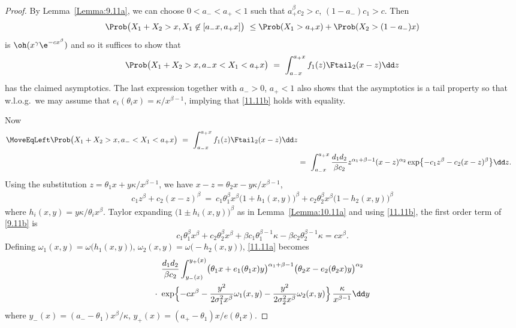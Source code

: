 \begin{proof}
By Lemma~\ref{Lemma:9.11a}, we can choose $0<a_-<a_+<1$ such that $a_+^\beta c_2>c$, $(1-a_-) c_1>c$.
Then
\[\Prob\bigl (X_1+X_2>x,X_1\not \in [a_-x,a_+x]\bigr)\ \le \Prob(X_1>a_+x)+
\Prob(X_2>(1-a_-)x)
\]
is $\oh(x^{\gamma}\e^{-cx^\beta})$ and so it suffices to show that
\begin{equation}\label{9.11a}\Prob\bigl (X_1+X_2>x, a_-x<X_1<a_+x\bigr)
\ =\ \int_{a_-x}^{a_+x} f_1(z)\Ftail_2(x-z)\dd z\end{equation}
has the claimed asymptotics. The last expression together with $a_->0$, $a_+<1$ also
shows that the asymptotics is a tail property so that w.l.o.g.\ we may assume that
$e_i(\theta_i x)=\kappa/x^{\beta-1}$,  implying  that \eqref{11.11b} holds with equality.

Now
\begin{align}\nonumber \MoveEqLeft  \Prob\bigl (X_1+X_2>x, a_-<X_1<a_+x\bigr)\ =\
\int_{a_-x}^{a_+x} f_1(z)\Ftail_2(x-z)\dd z\\ \label{11.11a} &= \ \int_{a_-x}^{a_+x} \frac{d_1d_2}{\beta c_2}
z^{\alpha_1+\beta-1}(x-z)^{\alpha_2}
\exp\bigl\{-c_1z^\beta-c_2(x-z)^\beta\bigr\}\dd z.
\end{align}
Using the substitution $z=\theta_1x+y\kappa/x^{\beta-1}$, we have $x-z= \theta_2x-y\kappa/x^{\beta-1}$,
\begin{align}\label{9.11b}
c_1z^\beta+c_2(x-z)^\beta \ =\ c_1\theta_1^\beta x^\beta
\bigl(1+h_1(x,y)\bigl)^\beta+c_2\theta_2^\beta x^\beta
\bigl(1-h_2(x,y)\bigl)^\beta
\end{align}
where $h_i(x,y)=y\kappa/\theta_ix^\beta$.
Taylor expanding  $\bigl(1\pm h_i(x,y)\bigl)^\beta$ as in Lemma~\ref{Lemma:10.11a}
and using \eqref{11.11b}, the first order term of \eqref{9.11b} is
\[ c_1\theta_1^\beta x^\beta +c_2\theta_2^\beta x^\beta + \beta c_1\theta_1^{\beta-1}\kappa - \beta c_2\theta_2^{\beta-1}\kappa =c x^\beta. \]
Defining
$\omega_1(x,y)=\omega\bigl(h_1(x,y)\bigr)$, $\omega_2(x,y)=\omega\bigl(-h_2(x,y)\bigr)$, \eqref{11.11a} becomes
 \begin{multline}\nonumber
\frac{d_1d_2}{\beta c_2} \int_{y_-(x)}^{y_+(x)}
\bigl(\theta_1x+e_1(\theta_1x)y\bigr)^{\alpha_1+\beta-1}\bigl(\theta_2x-e_2(\theta_2x)y\bigr)^{\alpha_2}
\\ \cdot\ \exp\Bigl\{-cx^\beta
-\frac{y^2}{2\sigma_1^2x^\beta}\omega_1(x,y)-\frac{y^2}{2\sigma_2^2x^\beta}\omega_2(x,y)
\Bigr\}\,\frac{\kappa}{x^{\beta-1}}\dd y
\end{multline}
where $y_-(x)=(a_--\theta_1)x^\beta/\kappa$, $y_+(x)=(a_+-\theta_1)x/e(\theta_1 x)$.

\end{proof}
